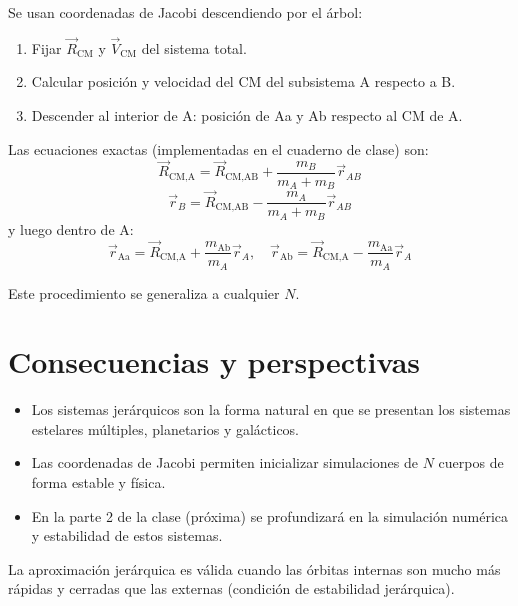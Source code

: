 Se usan coordenadas de Jacobi descendiendo por el árbol:
\begin{enumerate}
    \item Fijar \(\vec{R}_{\text{CM}}\) y \(\vec{V}_{\text{CM}}\) del sistema total.
    \item Calcular posición y velocidad del CM del subsistema A respecto a B.
    \item Descender al interior de A: posición de Aa y Ab respecto al CM de A.
\end{enumerate}

Las ecuaciones exactas (implementadas en el cuaderno de clase) son:
\[
\vec{R}_{\text{CM,A}} = \vec{R}_{\text{CM,AB}} + \frac{m_B}{m_A + m_B} \vec{r}_{AB}
\]
\[
\vec{r}_B = \vec{R}_{\text{CM,AB}} - \frac{m_A}{m_A + m_B} \vec{r}_{AB}
\]
y luego dentro de A:
\[
\vec{r}_{\text{Aa}} = \vec{R}_{\text{CM,A}} + \frac{m_{\text{Ab}}}{m_A} \vec{r}_A, \quad
\vec{r}_{\text{Ab}} = \vec{R}_{\text{CM,A}} - \frac{m_{\text{Aa}}}{m_A} \vec{r}_A
\]

Este procedimiento se generaliza a cualquier \(N\).

\section{Consecuencias y perspectivas}
\begin{itemize}
    \item Los sistemas jerárquicos son la forma natural en que se presentan los sistemas estelares múltiples, planetarios y galácticos.
    \item Las coordenadas de Jacobi permiten inicializar simulaciones de \(N\) cuerpos de forma estable y física.
    \item En la parte 2 de la clase (próxima) se profundizará en la simulación numérica y estabilidad de estos sistemas.
\end{itemize}

\begin{importante}
La aproximación jerárquica es válida cuando las órbitas internas son mucho más rápidas y cerradas que las externas (condición de estabilidad jerárquica).
\end{importante}

